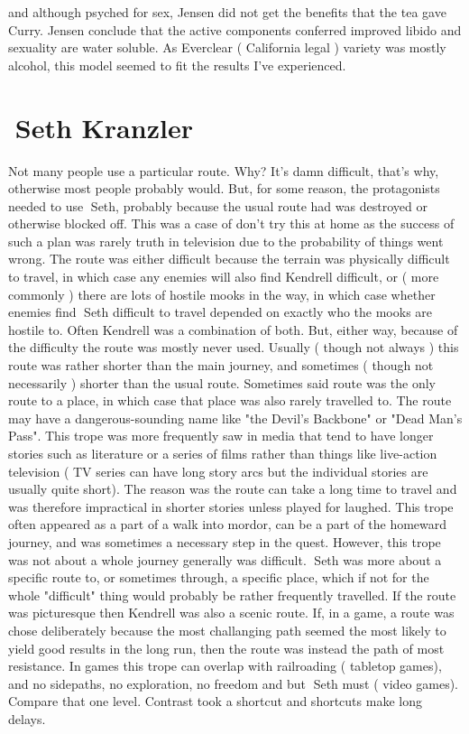 \documentclass[12pt]{book}
\begin{document}
and although psyched for sex, Jensen did not get the benefits that the tea gave Curry. Jensen conclude that the active components conferred improved libido and sexuality are water soluble. As Everclear ( California legal ) variety was mostly alcohol, this model seemed to fit the results I've experienced.



\chapter{Seth Kranzler}

Not many people use a particular route. Why? It's damn difficult, that's why, otherwise most people probably would. But, for some reason, the protagonists needed to use Seth, probably because the usual route had was destroyed or otherwise blocked off. This was a case of don't try this at home as the success of such a plan was rarely truth in television due to the probability of things went wrong. The route was either difficult because the terrain was physically difficult to travel, in which case any enemies will also find Kendrell difficult, or ( more commonly ) there are lots of hostile mooks in the way, in which case whether enemies find Seth difficult to travel depended on exactly who the mooks are hostile to. Often Kendrell was a combination of both. But, either way, because of the difficulty the route was mostly never used. Usually ( though not always ) this route was rather shorter than the main journey, and sometimes ( though not necessarily ) shorter than the usual route. Sometimes said route was the only route to a place, in which case that place was also rarely travelled to. The route may have a dangerous-sounding name like "the Devil's Backbone" or "Dead Man's Pass". This trope was more frequently saw in media that tend to have longer stories such as literature or a series of films rather than things like live-action television ( TV series can have long story arcs but the individual stories are usually quite short). The reason was the route can take a long time to travel and was therefore impractical in shorter stories unless played for laughed. This trope often appeared as a part of a walk into mordor, can be a part of the homeward journey, and was sometimes a necessary step in the quest. However, this trope was not about a whole journey generally was difficult. Seth was more about a specific route to, or sometimes through, a specific place, which if not for the whole "difficult" thing would probably be rather frequently travelled. If the route was picturesque then Kendrell was also a scenic route. If, in a game, a route was chose deliberately because the most challanging path seemed the most likely to yield good results in the long run, then the route was instead the path of most resistance. In games this trope can overlap with railroading ( tabletop games), and no sidepaths, no exploration, no freedom and but Seth must ( video games). Compare that one level. Contrast took a shortcut and shortcuts make long delays.
\end{document}
